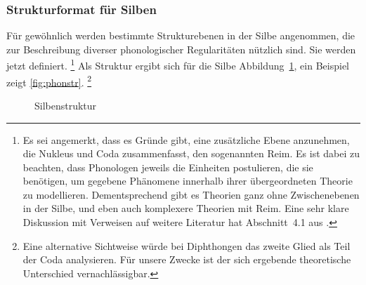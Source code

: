 
\subsubsection{Strukturformat für Silben}

\label{sec:silbenstruktur}

Für gewöhnlich werden bestimmte Strukturebenen in der Silbe angenommen, die zur Beschreibung diverser phonologischer Regularitäten nützlich sind.
Sie werden jetzt definiert.%
\footnote{Es sei angemerkt, dass es Gründe gibt, eine zusätzliche Ebene anzunehmen, die Nukleus und Coda zusammenfasst, den sogenannten Reim.
Es ist dabei zu beachten, dass Phonologen jeweils die Einheiten postulieren, die sie benötigen, um gegebene Phänomene innerhalb ihrer übergeordneten Theorie zu modellieren.
Dementsprechend gibt es Theorien ganz ohne Zwischenebenen in der Silbe, und eben auch komplexere Theorien mit Reim.
Eine sehr klare Diskussion mit Verweisen auf weitere Literatur hat Abschnitt~4.1 aus \citet{Eisenberg1}.}
Als Struktur ergibt sich für die Silbe Abbildung~\ref{fig:silbenstruktur}, ein Beispiel zeigt \ref{fig:phonstr}.%
\footnote{Eine alternative Sichtweise würde bei Diphthongen das zweite Glied als Teil der Coda analysieren.
Für unsere Zwecke ist der sich ergebende theoretische Unterschied vernachlässigbar.
}




\begin{figure}
  \centering
  \caption{Silbenstruktur}
  \label{fig:silbenstruktur}
\end{figure}

